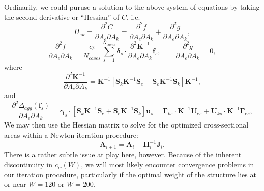 \documentclass[12pt,a4paper,article]{memoir} %
\begin{document}
Ordinarily, we could puruse a solution to the above system of equations by taking the second derivative or ``Hessian'' of $C$, i.e.
\begin{equation}
	H_{ek} = \frac{\partial^2 C}{\partial A_e \partial A_k} = \frac{\partial^2 f}{\partial A_e \partial A_k} + \frac{\partial^2 g}{\partial A_e \partial A_k},
\end{equation}
\begin{equation}
	\frac{\partial^2 f}{\partial A_e \partial A_k} = \frac{c_\delta}{N_{cases}} \sum_{s=1}^{N_{cases}} \boldsymbol{\delta}_s \cdot \frac{\partial^2 \mathbf{K}^{-1}}{\partial A_e \partial A_k} \mathbf{f}_s, \qquad \frac{\partial^2 g}{\partial A_e \partial A_k} = 0,
\end{equation}
where
\begin{equation}
	\frac{\partial^2 \mathbf{K}^{-1}}{\partial A_e \partial A_k} = \mathbf{K}^{-1} \left[ \mathbf{S}_k \mathbf{K}^{-1} \mathbf{S}_e + \mathbf{S}_e \mathbf{K}^{-1} \mathbf{S}_k \right] \mathbf{K}^{-1},
\end{equation}
and
\begin{equation}
	\frac{\partial^2 \Delta_{agg} (\mathbf{f}_s)}{\partial A_e \partial A_k} = \boldsymbol{\gamma}_s \cdot \left[ \mathbf{S}_k \mathbf{K}^{-1} \mathbf{S}_e + \mathbf{S}_e \mathbf{K}^{-1} \mathbf{S}_k \right] \mathbf{u}_s = \boldsymbol{\Gamma}_{ks} \cdot \mathbf{K}^{-1} \mathbf{U}_{es} + \mathbf{U}_{ks} \cdot \mathbf{K}^{-1} \boldsymbol{\Gamma}_{es},
\end{equation}
We may then use the Hessian matrix to solve for the optimized cross-sectional areas within a Newton iteration procedure:
\begin{equation}
	\mathbf{A}_{i+1} = \mathbf{A}_{i} - \mathbf{H}_i^{-1} \mathbf{J}_i.
\end{equation}
There is a rather subtle issue at play here, however. Because of the inherent discontinuity in $c_w (W)$, we will most likely encounter convergence problems in our iteration procedure, particularly if the optimal weight of the structure lies at or near $W = 120$ or $W = 200$.
\end{document}
